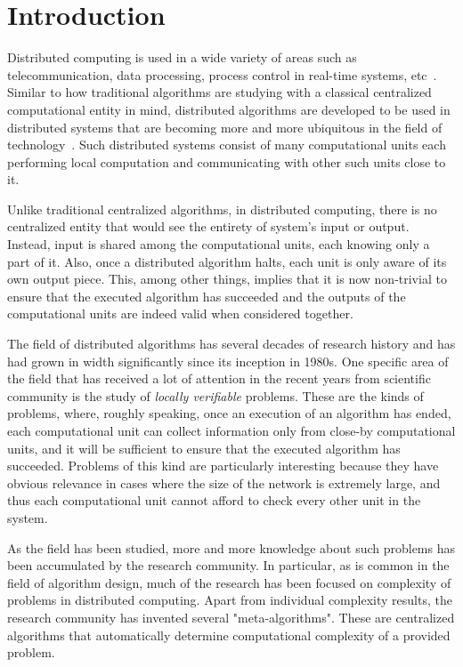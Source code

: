 \chapter{Introduction}
\label{chapter:intro}

Distributed computing is used in a wide variety of areas
such as telecommunication, data processing, process control in real-time systems, etc~\cite{Lynch1996}. Similar to
how traditional algorithms are studying with a classical
centralized computational entity in mind, distributed
algorithms are developed to be used in distributed
systems that are becoming more and more ubiquitous in the
field of technology~\cite{Attiya2004}. Such distributed
systems consist of many computational units each
performing local computation and communicating
with other such units close to it.

Unlike traditional
centralized algorithms, in distributed computing,
there is no centralized entity that would see the
entirety of system's input or output. Instead,
input is shared among the computational units, each
knowing only a part of it. Also, once a distributed
algorithm halts, each unit is only aware of its
own output piece. This, among other things, implies
that it is now non-trivial to ensure that the
executed algorithm has succeeded and the
outputs of the computational units are
indeed valid when considered together.

The field of distributed algorithms has several
decades of research history and has had grown
in width significantly since its inception in 1980s.
One specific
area of the field that has received a lot of
attention in the recent years from scientific
community is the study of \emph{locally verifiable}
problems.
These are the kinds of problems, where, roughly speaking,
once an execution of an algorithm has ended, each
computational unit can
collect information only from close-by computational units,
and it will be sufficient to ensure that the executed algorithm has succeeded. Problems of this kind are particularly
interesting because they have obvious relevance
in cases where the size of the network is extremely
large, and thus each computational unit
cannot afford to check every other unit in the system.

As the field has been studied, more and more knowledge
about such problems has been accumulated by the
research community. In particular, as is common
in the field of algorithm design, much of the
research has been focused on complexity of
problems in distributed computing. Apart from
individual complexity results, the research
community has invented several "meta-algorithms".
These are centralized algorithms that
automatically determine
computational complexity of a provided
problem.

